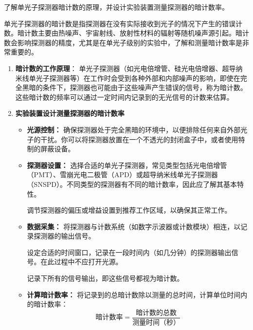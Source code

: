 \documentclass[dvipsnames, svgnames,a4paper,11pt]{article}
\begin{document}
\begin{question}
	了解单光子探测器暗计数的原理，并设计实验装置测量探测器的暗计数率。
\end{question}



	单光子探测器的暗计数是指探测器在没有实际接收到光子的情况下产生的错误计数。暗计数主要由热噪声、宇宙射线、放射性材料的辐射等随机噪声源引起。暗计数会影响探测器的精度，尤其是在单光子级别的实验中，了解和测量暗计数率是非常重要的。

	\begin{enumerate}
		\item \textbf{暗计数的工作原理}：
			单光子探测器（如光电倍增管、硅光电倍增器、超导纳米线单光子探测器等）在工作时会受到各种外部和内部噪声的影响，即使在完全黑暗的条件下，探测器也可能由于这些噪声产生错误的信号，称为暗计数。这些暗计数的频率可以通过一定时间内记录到的无光信号的计数来估算。

		\item \textbf{实验装置设计测量探测器的暗计数率}
			\begin{itemize}
				\item \textbf{光源控制：}
					确保探测器处于完全黑暗的环境中，以便排除任何来自外部光子的干扰。你可以将探测器放置在一个不透光的封闭盒子中，或者使用特制的屏蔽设备。

				\item \textbf{探测器设置：}
					选择合适的单光子探测器，常见类型包括光电倍增管（PMT）、雪崩光电二极管（APD）或超导纳米线单光子探测器（SNSPD）。不同类型的探测器有不同的暗计数率，因此应了解其基本特性。
					
					调节探测器的偏压或增益设置到推荐工作区域，以确保其正常工作。

				\item \textbf{数据采集：}
					将探测器与计数系统（如数字示波器或计数模块）相连，以记录探测器的输出信号。

					设定合适的时间窗口，记录在一段时间内（如几分钟）的探测器输出信号。在此过程中不应打开光源。

					记录下所有的信号输出，即这些信号都视为暗计数。

				\item \textbf{计算暗计数率：}
					将记录到的总暗计数除以测量的总时间，计算单位时间内的暗计数率：
					\[
						\text{暗计数率} = \frac{\text{暗计数的总数}}{\text{测量时间（秒）}}
					\]

			\end{itemize}
	\end{enumerate}
\end{document}
